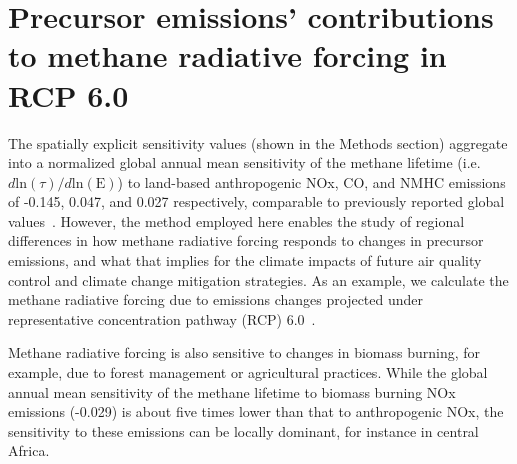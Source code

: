 \section{Precursor emissions' contributions to methane radiative forcing in RCP 6.0}

The spatially explicit sensitivity values (shown in the Methods section) aggregate into a normalized global annual mean sensitivity of the methane lifetime (i.e. $d \mathrm{ln}(\tau)/d\mathrm{ln}(\mathrm{E})$) to land-based anthropogenic NOx, CO, and NMHC emissions of -0.145, 0.047, and 0.027 respectively, comparable to previously reported global values~\citep{ref:fry2012,ref:holmes2013}. However, the method employed here enables the study of regional differences in how methane radiative forcing responds to changes in precursor emissions, and what that implies for the climate impacts of future air quality control and climate change mitigation strategies. As an example, we calculate the methane radiative forcing due to emissions changes projected under representative concentration pathway (RCP) 6.0~\citep{ref:vanvuuren2011}.




Methane radiative forcing is also sensitive to changes in biomass burning, for example, due to forest management or agricultural practices. While the global annual mean sensitivity of the methane lifetime to biomass burning NOx emissions (-0.029) is about five times lower than that to anthropogenic NOx, the sensitivity to these emissions can be locally dominant, for instance in central Africa.
